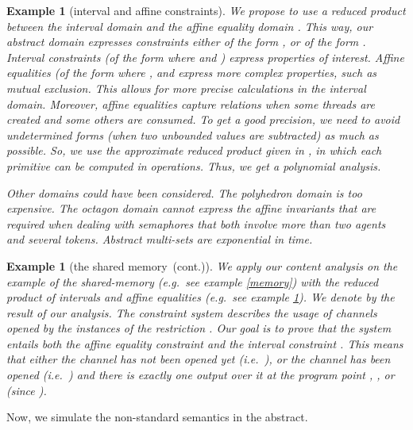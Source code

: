 \documentclass{article}
\newcommand{\boxexample}{}
\newtheorem{example}[thm]{Example}
\newcommand{\pp}[1]{}
\newcommand{\memlabb}{2}
\newcommand{\memlabf}{6}
\newcommand{\memlabj}{10}
\newcommand{\continued}{(cont.)}
\newcommand{\shareanalysis}{the shared memory}
\newcommand{\countdom}{interval and affine constraints}
\newcommand{\icount}{\countdom}
\newcommand{\icontentanalysis}{\shareanalysis\ \continued}
\begin{document}
\begin{example}[\icount]
\label{intequ}
We propose to use a reduced product between the interval domain \cite{cc76} and the affine equality domain \cite{karr}. This way, our abstract domain expresses constraints either of the form , or of the form . Interval constraints (of the form  where  and ) express properties of interest. Affine equalities (of the form  where , and  express more complex properties, such as mutual exclusion. This allows for more precise calculations in the interval domain. Moreover, affine equalities capture relations when some threads are created and some others are consumed. To get a good precision, we need  to avoid undetermined forms (when two unbounded values are subtracted) as much as possible.  So, we use the approximate reduced product given in \cite[Chap.~9]{feret:thesis}, in which each primitive can be computed in  operations. Thus, we get a polynomial analysis. 

Other domains could have been considered. 
The polyhedron domain  \cite{ch} is too  expensive.
The octagon domain   \cite{mine:thesis,mine} cannot express the affine invariants that are required when dealing with semaphores that both involve more than two agents and several tokens.
Abstract multi-sets \cite{HJNN99ai,NiNi00popl} are exponential  in time.
\boxexample\end{example}

\begin{example}[\icontentanalysis]
We apply our content analysis on the example of the shared-memory (e.g.~see example \ref{memory}) with the reduced product of intervals and affine equalities (e.g.~see example \ref{intequ}).
We denote by  the result of our analysis. 
The constraint system   describes the usage of channels opened by the instances of the restriction .
Our goal is to prove that the system  entails both the affine equality constraint  and the interval constraint .
This means that either the channel has not been opened yet (i.e.~), or the channel has been opened (i.e.~) and there is exactly one output over it at the program point \pp{\memlabb}, \pp{\memlabf}, or \pp{\memlabj} (since ).
\boxexample\end{example}

Now, we simulate the non-standard semantics in the abstract.
\end{document}
